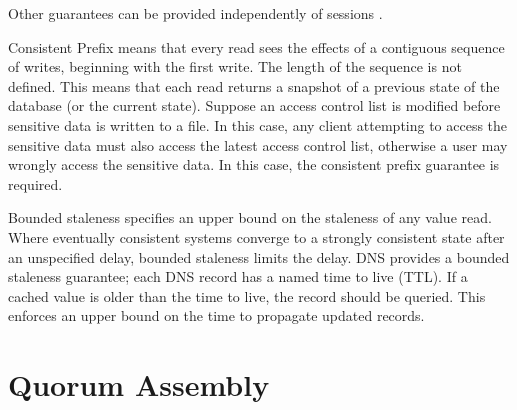 \documentclass[12pt,a4paper,twoside,openany]{report}
\begin{document}
Other guarantees can be provided independently of sessions \cite{terry2013}.

\begin{description}
\item{Consistent Prefix} means that every read sees the effects of a contiguous sequence of writes, beginning with the first write. The length of the sequence is not defined. This means that each read returns a snapshot of a previous state of the database (or the current state). Suppose an access control list is modified before sensitive data is written to a file. In this case, any client attempting to access the sensitive data must also access the latest access control list, otherwise a user may wrongly access the sensitive data. In this case, the consistent prefix guarantee is required. %

\item{Bounded staleness} specifies an upper bound on the staleness of any value read. Where eventually consistent systems converge to a strongly consistent state after an unspecified delay, bounded staleness limits the delay. DNS provides a bounded staleness guarantee; each DNS record has a named time to live (TTL). If a cached value is older than the time to live, the record should be queried. This enforces an upper bound on the time to propagate updated records. %



\end{description}

\section{Quorum Assembly}
\end{document}
